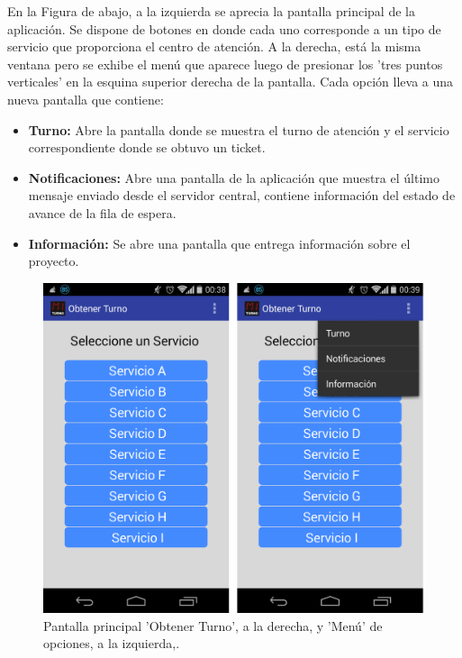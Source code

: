 En la Figura de abajo, a la izquierda se aprecia la pantalla principal de la aplicación. Se dispone de botones en donde cada uno corresponde a un tipo de servicio que proporciona el centro de atención. A la derecha, está la misma ventana pero se exhibe el menú que aparece luego de presionar los 'tres puntos verticales' en la esquina superior derecha de la pantalla. Cada opción lleva a una nueva pantalla que contiene: 


\begin{itemize}
\item \textbf{Turno:} Abre la pantalla donde se muestra el turno de atención y el servicio correspondiente donde se obtuvo un ticket.
\item \textbf{Notificaciones:} Abre una pantalla de la aplicación que muestra el último mensaje enviado desde el servidor central, contiene información del estado de avance de la fila de espera.
\item \textbf{Información:} Se abre una pantalla que entrega información sobre el proyecto.
\end{itemize}


\begin{figure}[H]
\centering
\includegraphics[scale=0.30]{images/capitulo5/obtenerTurno.png}
\caption{Pantalla principal 'Obtener Turno', a la derecha, y 'Menú' de opciones, a la izquierda,.}
\label{obtenerTurnoMenu}
\end{figure}

